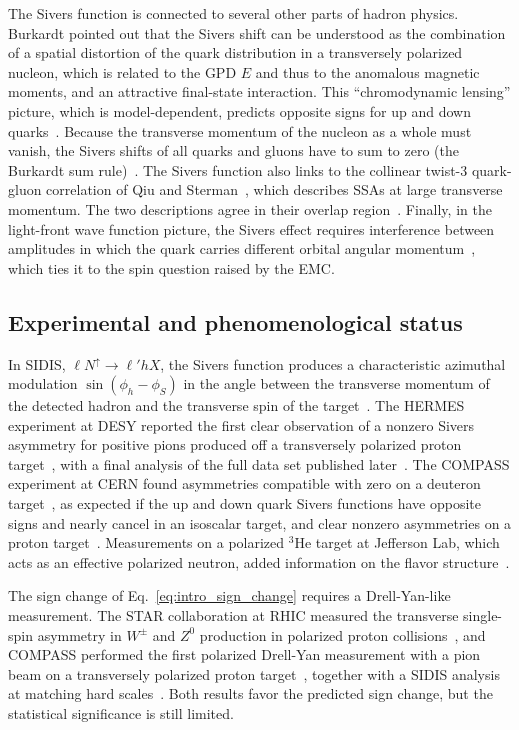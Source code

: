 The Sivers function is connected to several other parts of hadron physics. Burkardt pointed out that the Sivers shift can be understood as the combination of a spatial distortion of the quark distribution in a transversely polarized nucleon, which is related to the GPD $E$ and thus to the anomalous magnetic moments, and an attractive final-state interaction. This ``chromodynamic lensing'' picture, which is model-dependent, predicts opposite signs for up and down quarks~\cite{Burkardt:2002ks,Burkardt:2003uw}. Because the transverse momentum of the nucleon as a whole must vanish, the Sivers shifts of all quarks and gluons have to sum to zero (the Burkardt sum rule)~\cite{Burkardt:2004ur}. The Sivers function also links to the collinear twist-3 quark-gluon correlation of Qiu and Sterman~\cite{Qiu:1991pp}, which describes SSAs at large transverse momentum. The two descriptions agree in their overlap region~\cite{Ji:2006ub}. Finally, in the light-front wave function picture, the Sivers effect requires interference between amplitudes in which the quark carries different orbital angular momentum~\cite{Brodsky:2002cx}, which ties it to the spin question raised by the EMC.

\subsection{Experimental and phenomenological status}
\label{sec:intro_experiments}

In SIDIS, $\ell N^\uparrow \to \ell' h X$, the Sivers function produces a characteristic azimuthal modulation $\sin(\phi_h-\phi_S)$ in the angle between the transverse momentum of the detected hadron and the transverse spin of the target~\cite{Bacchetta:2006tn}. The HERMES experiment at DESY reported the first clear observation of a nonzero Sivers asymmetry for positive pions produced off a transversely polarized proton target~\cite{HERMES:2009lmz}, with a final analysis of the full data set published later~\cite{HERMES:2020ifk}. The COMPASS experiment at CERN found asymmetries compatible with zero on a deuteron target~\cite{COMPASS:2008isr}, as expected if the up and down quark Sivers functions have opposite signs and nearly cancel in an isoscalar target, and clear nonzero asymmetries on a proton target~\cite{COMPASS:2014bze}. Measurements on a polarized $^3$He target at Jefferson Lab, which acts as an effective polarized neutron, added information on the flavor structure~\cite{JeffersonLabHallA:2011ayy}.

The sign change of Eq.~\eqref{eq:intro_sign_change} requires a Drell-Yan-like measurement. The STAR collaboration at RHIC measured the transverse single-spin asymmetry in $W^\pm$ and $Z^0$ production in polarized proton collisions~\cite{STAR:2015vmv}, and COMPASS performed the first polarized Drell-Yan measurement with a pion beam on a transversely polarized proton target~\cite{COMPASS:2017jbv}, together with a SIDIS analysis at matching hard scales~\cite{COMPASS:2016led}. Both results favor the predicted sign change, but the statistical significance is still limited.

